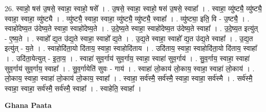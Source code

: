 \documentclass[17pt]{extarticle}
\begin{document}
26. स्वाहो॒ षस॑ उ॒षसे॒ स्वाहा॒ स्वाहो॒ षसे᳚ । . उ॒षसे॒ स्वाहा॒ स्वाहो॒ षस॑ उ॒षसे॒ स्वाहा᳚ । . स्वाहा॒ व्यु॑ष्ट्यै॒ व्यु॑ष्ट्यै॒ स्वाहा॒ स्वाहा॒ व्यु॑ष्ट्यै । . व्यु॑ष्ट्यै॒ स्वाहा॒ स्वाहा॒ व्यु॑ष्ट्यै॒ व्यु॑ष्ट्यै॒ स्वाहा᳚ । . व्यु॑ष्ट्या॒ इति॒ वि - उ॒ष्ट्यै॒ । . स्वाहो॑देष्य॒त उ॑देष्य॒ते स्वाहा॒ स्वाहो॑देष्य॒ते । . उ॒दे॒ष्य॒ते स्वाहा॒ स्वाहो॑देष्य॒त उ॑देष्य॒ते स्वाहा᳚ । . उ॒दे॒ष्य॒त इत्यु॑त् - ए॒ष्य॒ते । . स्वाहो᳚ द्य॒त उ॑द्य॒ते स्वाहा॒ स्वाहो᳚ द्य॒ते । . उ॒द्य॒ते स्वाहा॒ स्वाहो᳚ द्य॒त उ॑द्य॒ते स्वाहा᳚ । . उ॒द्य॒त इत्यु॑त् - य॒ते । . स्वाहोदि॑ता॒यो दि॑ताय॒ स्वाहा॒ स्वाहोदि॑ताय । . उदि॑ताय॒ स्वाहा॒ स्वाहोदि॑ता॒यो दि॑ताय॒ स्वाहा᳚ । . उदि॑ता॒येत्युत् - इ॒ता॒य॒ । . स्वाहा॑ सुव॒र्गाय॑ सुव॒र्गाय॒ स्वाहा॒ स्वाहा॑ सुव॒र्गाय॑ । . सु॒व॒र्गाय॒ स्वाहा॒ स्वाहा॑ सुव॒र्गाय॑ सुव॒र्गाय॒ स्वाहा᳚ । . सु॒व॒र्गायेति॑ सुवः - गाय॑ । . स्वाहा॑ लो॒काय॑ लो॒काय॒ स्वाहा॒ स्वाहा॑ लो॒काय॑ । . लो॒काय॒ स्वाहा॒ स्वाहा॑ लो॒काय॑ लो॒काय॒ स्वाहा᳚ । . स्वाहा॒ सर्व॑स्मै॒ सर्व॑स्मै॒ स्वाहा॒ स्वाहा॒ सर्व॑स्मै । . सर्व॑स्मै॒ स्वाहा॒ स्वाहा॒ सर्व॑स्मै॒ सर्व॑स्मै॒ स्वाहा᳚ । . स्वाहेति॒ स्वाहा᳚ । \newline

\textbf{Ghana Paata } \newline
\end{document}
